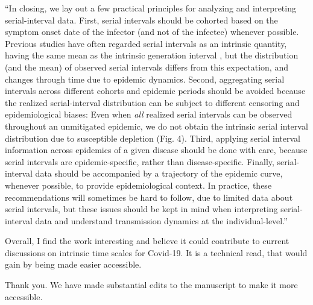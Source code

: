 \documentclass[12pt]{article}
\newcommand{\revtext}{\textsf}
\begin{document}
``In closing, we lay out a few practical principles for analyzing and interpreting serial-interval data.
First, serial intervals should be cohorted based on the symptom onset date of the infector (and not of the infectee) whenever possible.
Previous studies have often regarded serial intervals as an intrinsic quantity, having the same mean as the intrinsic generation interval \citep{svensson2007note,klinkenberg2011correlation,champredon2018equivalence, britton2019estimation}, but the distribution (and the mean) of observed serial intervals differs from this expectation, and changes through time due to epidemic dynamics.
Second, aggregating serial intervals across different cohorts and epidemic periods should be avoided because the realized serial-interval distribution can be subject to different censoring and epidemiological biases:
Even when \emph{all} realized serial intervals can be observed throughout an unmitigated epidemic, we do not obtain the intrinsic serial interval distribution due to susceptible depletion (Fig. 4).
Third, applying serial interval information across epidemics of a given disease should be done with care, because serial intervals are epidemic-specific, rather than disease-specific.
Finally, serial-interval data should be accompanied by a trajectory of the epidemic curve, whenever possible, to provide epidemiological context.
In practice, these recommendations will sometimes be hard to follow, due to limited data about serial intervals, but these issues should be kept in mind when interpreting serial-interval data and understand transmission dynamics at the individual-level.''

\revtext{Overall, I find the work interesting and believe it could contribute to current discussions on intrinsic time scales for Covid-19. It is a technical read, that would gain by being made easier accessible.}

Thank you. We have made substantial edits to the manuscript to make it more accessible.


\end{document}
